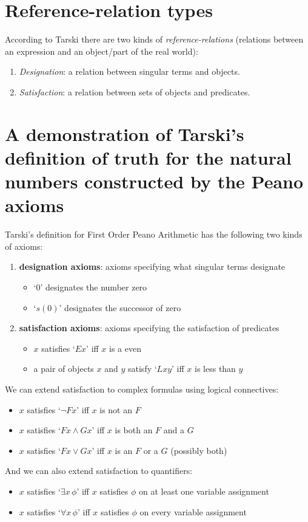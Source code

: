 \section{Reference-relation types}

According to Tarski there are two kinds of \emph{reference-relations} (relations between an expression and an object/part of the real world):

\begin{definition}\leavevmode
\begin{enumerate}[label=\roman*.]
  \item \emph{Designation}: a relation between singular terms and objects.
  \item \emph{Satisfaction}: a relation between sets of objects and predicates.
\end{enumerate}
\end{definition}

\section{A demonstration of Tarski's definition of truth for the natural numbers constructed by the Peano axioms}
\begin{slide}
Tarski's definition for First Order Peano Arithmetic has the following two kinds of axioms:
\begin{enumerate}
  \item \textbf{designation axioms}: axioms specifying what singular terms designate
  \begin{itemize}
    \item `0' designates the number zero
    \item `$s(0)$' designates the successor of zero
  \end{itemize}
  \item \textbf{satisfaction axioms}: axioms specifying the satisfaction of predicates
  \begin{itemize}
    \item $x$ satisfies `$Ex$' iff $x$ is a even
    \item a pair of objects $x$ and $y$ satisfy `$Lxy$' iff $x$ is less than $y$
  \end{itemize}
\end{enumerate}
We can extend satisfaction to complex formulas using logical connectives:
\begin{itemize}
  \item $x$ satisfies `$\neg Fx$' iff $x$ is not an $F$
  \item $x$ satisfies `$Fx \wedge Gx$' iff $x$ is both an $F$ and a $G$
  \item $x$ satisfies `$Fx \vee Gx$' iff $x$ is an $F$ or a $G$ (possibly both)
\end{itemize}
And we can also extend satisfaction to quantifiers:
\begin{itemize}
  \item $x$ satisfies `$\exists x\, \phi$' iff $x$ satisfies $\phi$ on at least one variable assignment
  \item $x$ satisfies `$\forall x\, \phi$' iff $x$ satisfies $\phi$ on every variable assignment
\end{itemize}
\end{slide}

